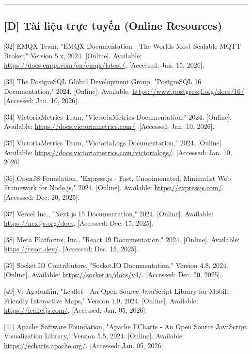 \documentclass[a4paper]{extarticle}
\begin{document}
\begin{center}\rule{0.5\linewidth}{0.5pt}\end{center}

\subsection{{[}D{]} Tài liệu trực tuyến (Online
Resources)}\label{d-tuxe0i-liux1ec7u-trux1ef1c-tuyux1ebfn-online-resources}

{[}32{]} EMQX Team, "EMQX Documentation - The World\textquotesingle s
Most Scalable MQTT Broker," Version 5.x, 2024. {[}Online{]}. Available:
\url{https://docs.emqx.com/en/emqx/latest/}. {[}Accessed: Jan. 15,
2026{]}.

{[}33{]} The PostgreSQL Global Development Group, "PostgreSQL 16
Documentation," 2024. {[}Online{]}. Available:
\url{https://www.postgresql.org/docs/16/}. {[}Accessed: Jan. 10,
2026{]}.

{[}34{]} VictoriaMetrics Team, "VictoriaMetrics Documentation," 2024.
{[}Online{]}. Available: \url{https://docs.victoriametrics.com/}.
{[}Accessed: Jan. 10, 2026{]}.

{[}35{]} VictoriaMetrics Team, "VictoriaLogs Documentation," 2024.
{[}Online{]}. Available:
\url{https://docs.victoriametrics.com/victorialogs/}. {[}Accessed: Jan.
10, 2026{]}.

{[}36{]} OpenJS Foundation, "Express.js - Fast, Unopinionated,
Minimalist Web Framework for Node.js," 2024. {[}Online{]}. Available:
\url{https://expressjs.com/}. {[}Accessed: Dec. 20, 2025{]}.

{[}37{]} Vercel Inc., "Next.js 15 Documentation," 2024. {[}Online{]}.
Available: \url{https://nextjs.org/docs}. {[}Accessed: Dec. 15, 2025{]}.

{[}38{]} Meta Platforms, Inc., "React 19 Documentation," 2024.
{[}Online{]}. Available: \url{https://react.dev/}. {[}Accessed: Dec. 15,
2025{]}.

{[}39{]} Socket.IO Contributors, "Socket.IO Documentation," Version 4.8,
2024. {[}Online{]}. Available: \url{https://socket.io/docs/v4/}.
{[}Accessed: Dec. 20, 2025{]}.

{[}40{]} V. Agafonkin, "Leaflet - An Open-Source JavaScript Library for
Mobile-Friendly Interactive Maps," Version 1.9, 2024. {[}Online{]}.
Available: \url{https://leafletjs.com/}. {[}Accessed: Jan. 05, 2026{]}.

{[}41{]} Apache Software Foundation, "Apache ECharts - An Open Source
JavaScript Visualization Library," Version 5.5, 2024. {[}Online{]}.
Available: \url{https://echarts.apache.org/}. {[}Accessed: Jan. 05,
2026{]}.
\end{document}
